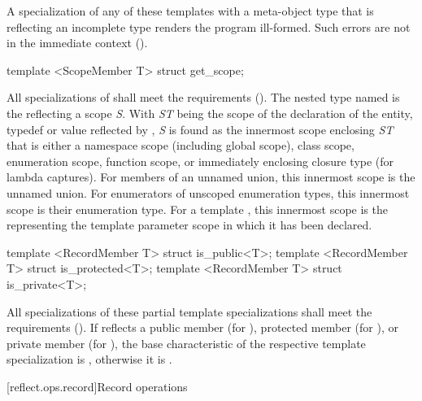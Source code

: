 \begin{std.txt}\color{addclr}
\pnum
A specialization of any of these templates with a meta-object type that is
reflecting an incomplete type renders the program ill-formed.  Such errors are
not in the immediate context ().


\begin{itemdecl}
template <ScopeMember T> struct get_scope;
\end{itemdecl}

\begin{itemdescr}
\pnum
All specializations of  shall meet the  requirements (). The nested type named  is the  reflecting a scope \emph{S}. With \emph{ST} being the scope of the declaration of the entity, typedef or value reflected by , \emph{S} is found as the innermost scope enclosing \emph{ST} that is either a namespace scope (including global scope), class scope, enumeration scope, function scope, or immediately enclosing closure type (for lambda captures). For members of an unnamed union, this innermost scope is the unnamed union. For enumerators of unscoped enumeration types, this innermost scope is their enumeration type.
For a template , this innermost scope is the  representing the template parameter scope in which it has been declared.
\end{itemdescr}

\begin{itemdecl}
template <RecordMember T> struct is_public<T>;
template <RecordMember T> struct is_protected<T>;
template <RecordMember T> struct is_private<T>;
\end{itemdecl}

\begin{itemdescr}
\pnum
All specializations of these partial template specializations shall meet the  requirements (). If  reflects a public member (for ), protected member (for ), or private member (for ), the base characteristic of the respective template specialization is , otherwise it is .
\end{itemdescr}

\end{std.txt}

[reflect.ops.record]{Record operations}

